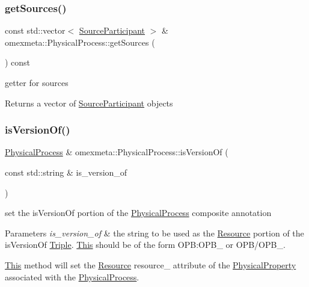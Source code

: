 \subsubsection{\texorpdfstring{get\+Sources()}{getSources()}}
{\footnotesize\ttfamily const std\+::vector$<$ \hyperlink{classomexmeta_1_1SourceParticipant}{Source\+Participant} $>$ \& omexmeta\+::\+Physical\+Process\+::get\+Sources (\begin{DoxyParamCaption}{ }\end{DoxyParamCaption}) const}



getter for sources 

\begin{DoxyReturn}{Returns}
a vector of \hyperlink{classomexmeta_1_1SourceParticipant}{Source\+Participant} objects 
\end{DoxyReturn}
\mbox{\label{classomexmeta_1_1PhysicalProcess_a52ff2832ac567a4cee2043d37ddcbc6b}} 
\subsubsection{\texorpdfstring{is\+Version\+Of()}{isVersionOf()}}
{\footnotesize\ttfamily \hyperlink{classomexmeta_1_1PhysicalProcess}{Physical\+Process} \& omexmeta\+::\+Physical\+Process\+::is\+Version\+Of (\begin{DoxyParamCaption}\item[{const std\+::string \&}]{is\+\_\+version\+\_\+of }\end{DoxyParamCaption})}



set the is\+Version\+Of portion of the \hyperlink{classomexmeta_1_1PhysicalProcess}{Physical\+Process} composite annotation 


\begin{DoxyParams}{Parameters}
{\em is\+\_\+version\+\_\+of} & the string to be used as the \hyperlink{classomexmeta_1_1Resource}{Resource} portion of the is\+Version\+Of \hyperlink{classomexmeta_1_1Triple}{Triple}. \hyperlink{classThis}{This} should be of the form O\+PB\+:O\+P\+B\+\_ or O\+P\+B/\+O\+P\+B\+\_.\\
\hline
\end{DoxyParams}
\hyperlink{classThis}{This} method will set the \hyperlink{classomexmeta_1_1Resource}{Resource} resource\+\_\+ attribute of the \hyperlink{classomexmeta_1_1PhysicalProperty}{Physical\+Property} associated with the \hyperlink{classomexmeta_1_1PhysicalProcess}{Physical\+Process}. \mbox{\label{classomexmeta_1_1PhysicalProcess_a6aacc0d7277768fc7a146b46b8606d97}} 
